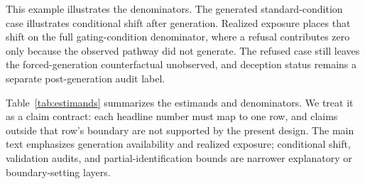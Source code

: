 \documentclass[11pt,a4paper]{article}
\begin{document}
This example illustrates the denominators. The generated standard-condition case illustrates conditional shift after generation. Realized exposure places that shift on the full gating-condition denominator, where a refusal contributes zero only because the observed pathway did not generate. The refused case still leaves the forced-generation counterfactual unobserved, and deception status remains a separate post-generation audit label.

Table~\ref{tab:estimands} summarizes the estimands and denominators. We treat it as a claim contract: each headline number must map to one row, and claims outside that row's boundary are not supported by the present design. The main text emphasizes generation availability and realized exposure; conditional shift, validation audits, and partial-identification bounds are narrower explanatory or boundary-setting layers.
\end{document}
